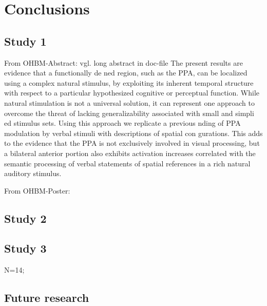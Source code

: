 \section{Conclusions}



\subsection{Study 1}
%
From OHBM-Abstract: vgl. long abstract in doc-file
%
The present results are evidence that a functionally de ned region, such as the
PPA, can be localized using a complex natural stimulus, by exploiting its
inherent temporal structure with respect to a particular hypothesized cognitive
or perceptual function.
%
While natural stimulation is not a universal solution, it can represent one
approach to overcome the threat of lacking generalizability associated with
small and simpli ed stimulus sets.
%
Using this approach we replicate a previous nding of PPA modulation by verbal
stimuli with descriptions of spatial con gurations.
%
This adds to the evidence that the PPA is not exclusively involved in visual
processing, but a bilateral anterior portion also exhibits activation increases
correlated with the semantic processing of verbal statements of spatial
references in a rich natural auditory stimulus.

%
From OHBM-Poster:


\subsection{Study 2}



\subsection{Study 3}

N=14;



\subsection{Future research}



